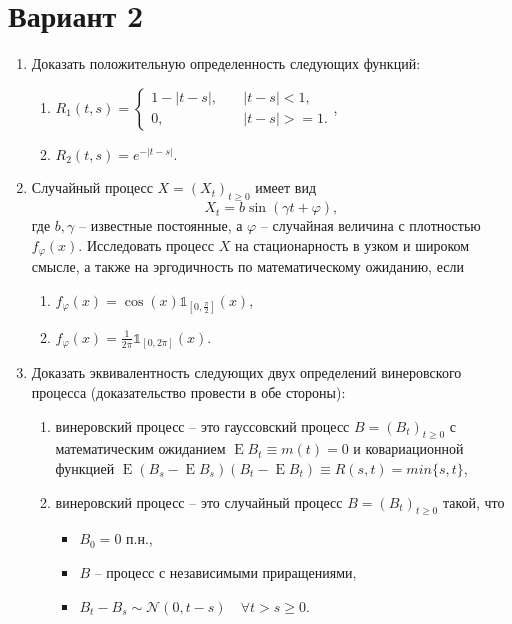 \documentclass[a4paper,14pt]{extreport}
\renewcommand{\=}[1]{\stackrel{#1}{=}} %
\newcommand{\Expect}{\mathop{{}\mathrm{E}}}
\newcommand{\generaltime}{t \geqslant 0}
\newcommand{\newprocess}[1]{
	\ensuremath{
		#1 = \left(#1 _t\right)_{\generaltime}
	}
}
\begin{document}
\newpage 

\section*{Вариант 2}


\begin{enumerate}

\item Доказать положительную определенность следующих функций:
	\begin{enumerate}
		\item $R_1(t, s) = 
			\begin{cases}
				1 - |t - s|, \quad & |t - s| < 1, \\
				0, \quad & |t - s| >= 1.
			\end{cases}$,
		\item $R_2(t, s) = e^{- |t - s|}$.
	\end{enumerate}

\item Случайный процесс $\newprocess{X}$ имеет вид
\[
X_t = b \sin (\gamma t + \varphi),
\]
где $b, \gamma$ -- известные постоянные, а $\varphi$ -- 
случайная величина с плотностью $f_{\varphi}(x)$. Исследовать
процесс $X$ на стационарность в узком и широком смысле,
а также на эргодичность по математическому ожиданию,
если 
	\begin{enumerate}
		\item $f_{\varphi}(x) = \cos(x) \mathds{1}_{[0, \frac \pi 2]}(x)$,
		\item $f_{\varphi}(x) = \frac{1}{2\pi} \mathds{1}_{[0, 2 \pi]}(x)$.
	\end{enumerate}

\item Доказать эквивалентность следующих двух определений
винеровского процесса (доказательство провести в обе стороны):
	\begin{enumerate}
		\item винеровский процесс -- это гауссовский
		процесс $\newprocess{B}$ с математическим ожиданием
		$\Expect B_t \equiv m(t) = 0$ и ковариационной
		функцией $\Expect (B_s - \Expect B_s) (B_t - \Expect B_t)
		\equiv R(s, t) = min\{s, t\}$,
		\item винеровский процесс -- это случайный процесс $\newprocess{B}$ такой, что
		\begin{itemize}
    		\item $B_0 = 0$ п.н.,
    		\item $B$ -- процесс с независимыми приращениями,
    		\item $B_t - B_s \sim \mathcal{N}(0, t - s) \quad \forall t > s \geqslant 0$.
		\end{itemize}
	\end{enumerate}


\end{enumerate}
\end{document}
